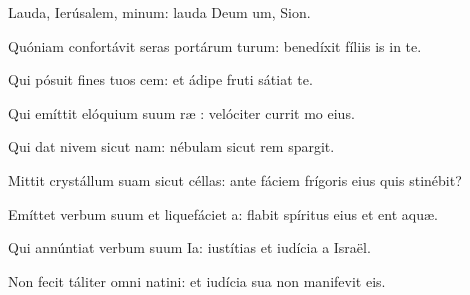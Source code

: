 \item {}

\item Lauda, Ierúsalem, minum:\psstar{} lauda Deum um, Sion.

\item Quóniam confortávit seras portárum turum:\psstar{} benedíxit fíliis is in te.

\item Qui pósuit fines tuos cem:\psstar{} et ádipe fruti sátiat te.

\item Qui emíttit elóquium suum ræ :\psstar{} velóciter currit mo eius.

\item Qui dat nivem sicut nam:\psstar{} nébulam sicut rem spargit.

\item Mittit crystállum suam sicut céllas:\psstar{} ante fáciem frígoris eius quis stinébit?

\item Emíttet verbum suum et liquefáciet a:\psstar{} flabit spíritus eius et ent aquæ.

\item Qui annúntiat verbum suum Ia:\psstar{} iustítias et iudícia a Israël.

\item Non fecit táliter omni natini:\psstar{} et iudícia sua non manifevit eis.
